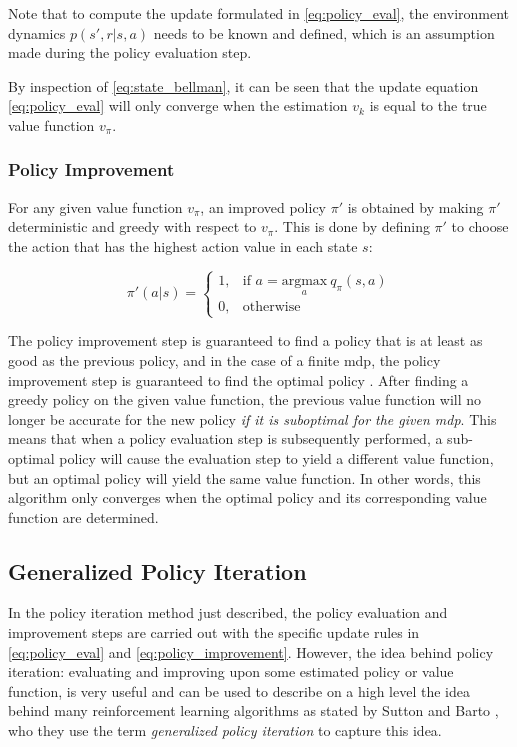 \documentclass[../report.tex]{subfiles}
\begin{document}
Note that to compute the update formulated in \autoref{eq:policy_eval}, the environment dynamics $p(s',r|s,a)$ needs to be known and defined, which is an assumption made during the policy evaluation step.

By inspection of \autoref{eq:state_bellman}, it can be seen that the update equation \autoref{eq:policy_eval} will only converge when the estimation $v_k$ is equal to the true value function $v_{\pi}$.

\subsubsection{Policy Improvement}

For any given value function $v_{\pi}$, an improved policy $\pi'$ is obtained by making $\pi'$ deterministic and greedy with respect to $v_{\pi}$. This is done by defining $\pi'$ to choose the action that has the highest action value in each state $s$:

{\myfont
\begin{equation}\label{eq:policy_improvement}
    \pi'(a|s) = \begin{cases}
    1,& \text{if } a = \underset{a}{\text{argmax}} \ q_{\pi}(s,a) \\
    0,              & \text{otherwise}
\end{cases}
\end{equation}
}

The policy improvement step is guaranteed to find a policy that is at least as good as the previous policy, and in the case of a finite \ac{mdp}, the policy improvement step is guaranteed to find the optimal policy \cite{dp}. After finding a greedy policy on the given value function, the previous value function will no longer be accurate for the new policy \textit{if it is suboptimal for the given \ac{mdp}}. This means that when a policy evaluation step is subsequently performed, a sub-optimal policy will cause the evaluation step to yield a different value function, but an optimal policy will yield the same value function. In other words, this algorithm only converges when the optimal policy and its corresponding value function are determined\cite{intro_rl}.

\subsection{Generalized Policy Iteration}\label{subsec:gpi}

In the policy iteration method just described, the policy evaluation and improvement steps are carried out with the specific update rules in \autoref{eq:policy_eval} and \autoref{eq:policy_improvement}. However, the idea behind policy iteration: evaluating and improving upon some estimated policy or value function, is very useful and can be used to describe on a high level the idea behind many reinforcement learning algorithms as stated by Sutton and Barto \cite{intro_rl}, who they use the term \textit{generalized policy iteration} to capture this idea.
\end{document}
